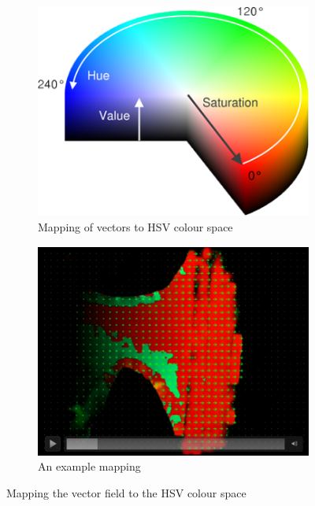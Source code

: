\documentclass[a4paper,10pt]{article}
\begin{document}
      \begin{figure}[htbp!]
        \centering
        \begin{subfigure}[b]{0.3\textwidth}
          \includegraphics[width=\textwidth]{HSV}
          \caption{Mapping of vectors to HSV colour space}
          \label{fig:hsv}
        \end{subfigure}
        \begin{subfigure}[b]{0.3\textwidth}
          \includegraphics[width=\textwidth]{colour}
          \caption{An example mapping}
          \label{fig:colourmap}
        \end{subfigure}
        \caption{Mapping the vector field to the HSV colour space}
        \label{fig:colour}
      \end{figure}
      
\end{document}
